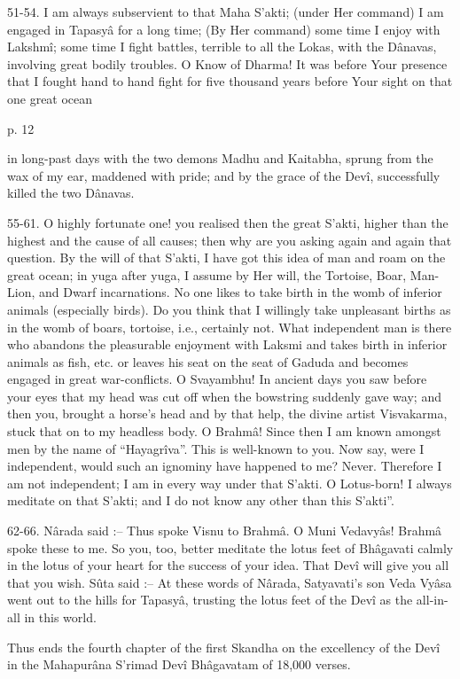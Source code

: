  

51-54. I am always subservient to that Maha S’akti; (under Her command) I am engaged in Tapasyâ for a long time; (By Her command) some time I enjoy with Lakshmî; some time I fight battles, terrible to all the Lokas, with the Dânavas, involving great bodily troubles. O Know of Dharma! It was before Your presence that I fought hand to hand fight for five thousand  years before Your sight on that one great ocean

 

p. 12

 

in long-past days with the two demons Madhu and Kaitabha, sprung from the wax of my ear, maddened with pride; and by the grace of the Devî, successfully killed the two Dânavas.

 

55-61. O highly fortunate one! you realised then the great S’akti, higher than the highest and the cause of all causes; then why are you asking again and again that question. By the will of that S’akti, I have got this idea of man and roam on the great ocean; in yuga after yuga, I assume by Her will, the Tortoise, Boar, Man-Lion, and Dwarf incarnations. No one likes to take birth in the womb of inferior animals (especially birds). Do you think that I willingly take unpleasant births as in the womb of boars, tortoise, i.e., certainly not. What independent man is there who abandons the pleasurable enjoyment with Laksmi and takes birth in inferior animals as fish, etc. or leaves his seat on the seat of Gaduda and becomes engaged in great war-conflicts. O Svayambhu! In ancient days you saw before your eyes that my head was cut off when the bowstring suddenly gave way; and then you, brought a horse's head and by that help, the divine artist Visvakarma, stuck that on to my headless body. O Brahmâ! Since then I am known amongst men by the name of  “Hayagrîva”. This is well-known to you. Now say, were I independent, would such an ignominy have happened to me? Never. Therefore I am not independent; I am in every way under that S’akti. O Lotus-born! I always meditate on that S’akti; and I do not know any other than this S’akti”.

 

62-66. Nârada said :-- Thus spoke Visnu to Brahmâ. O Muni Vedavyâs! Brahmâ spoke these to me. So you, too, better meditate the lotus feet of Bhâgavati calmly in the lotus of your heart for the success of your idea. That Devî will give you all that you wish. Sûta said :-- At these words of Nârada, Satyavati's son Veda Vyâsa went out to the hills for Tapasyâ, trusting the lotus feet of the Devî as the all-in-all in this world.

 

Thus ends the fourth chapter of the first Skandha on the excellency of the Devî in the Mahapurâna S’rimad Devî Bhâgavatam of 18,000 verses.

